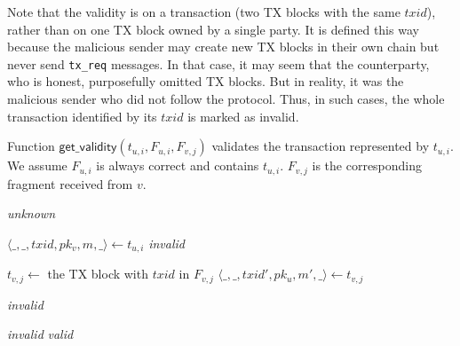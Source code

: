 Note that the validity is on a transaction (two TX blocks with the same $txid$), rather than on one TX block owned by a single party.
It is defined this way because the malicious sender may create new TX blocks in their own chain but never send \texttt{tx\_req} messages.
In that case, it may seem that the counterparty, who is honest, purposefully omitted TX blocks.
But in reality, it was the malicious sender who did not follow the protocol.
Thus, in such cases, the whole transaction identified by its $txid$ is marked as invalid.


\begin{algorithm}
\caption{Function $\textsf{get\_validity}(t_{u, i}, F_{u, i}, F_{v, j})$ validates the transaction represented by $t_{u, i}$.
We assume $F_{u, i}$ is always correct and contains $t_{u, i}$.
$F_{v, j}$ is the corresponding fragment received from $v$.}
\label{alg:get-validity}

\begin{algorithmic}[1]

        \State \Return \emph{unknown}
    \EndIf
    \State

    \label{line:valid-fragment}
    \State $\langle \_, \_, txid, pk_v, m, \_ \rangle \gets t_{u, i}$
        \State \Return \emph{invalid}
    \EndIf
    \State

    \State $t_{v, j} \gets $ the TX block with $txid$ in $F_{v, j}$
    \State $\langle \_, \_, txid', pk_u, m', \_ \rangle \gets t_{v, j}$ 

        \State \Return \emph{invalid}
    \EndIf
    \State

        \State \Return \emph{invalid}
    \EndIf
    \State \Return \emph{valid}
\end{algorithmic}
\end{algorithm}

